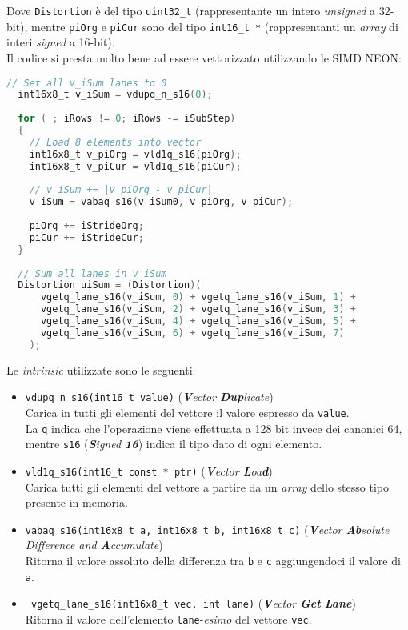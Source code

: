 Dove \verb|Distortion| è del tipo \verb|uint32_t| (rappresentante un intero 
\emph{unsigned} a 32-bit), mentre \verb|piOrg| e \verb|piCur| sono del tipo 
\verb|int16_t *| (rappresentanti un \emph{array} di interi \emph{signed} a 
16-bit).\\

Il codice si presta molto bene ad essere vettorizzato utilizzando le SIMD NEON:

\begin{lstlisting}[language=C]
  // Set all v_iSum lanes to 0
  int16x8_t v_iSum = vdupq_n_s16(0);
  
  for ( ; iRows != 0; iRows -= iSubStep)
  {
    // Load 8 elements into vector
    int16x8_t v_piOrg = vld1q_s16(piOrg);
    int16x8_t v_piCur = vld1q_s16(piCur);
    
    // v_iSum += |v_piOrg - v_piCur|
    v_iSum = vabaq_s16(v_iSum0, v_piOrg, v_piCur);
  
    piOrg += iStrideOrg;
    piCur += iStrideCur;
  }
  
  // Sum all lanes in v_iSum
  Distortion uiSum = (Distortion)(
      vgetq_lane_s16(v_iSum, 0) + vgetq_lane_s16(v_iSum, 1) +
      vgetq_lane_s16(v_iSum, 2) + vgetq_lane_s16(v_iSum, 3) +
      vgetq_lane_s16(v_iSum, 4) + vgetq_lane_s16(v_iSum, 5) +
      vgetq_lane_s16(v_iSum, 6) + vgetq_lane_s16(v_iSum, 7)
    );
\end{lstlisting}

Le \emph{intrinsic} utilizzate sono le seguenti:

\begin{itemize}
  \item \verb|vdupq_n_s16(int16_t value)| (\emph{\textbf{V}ector 
    \textbf{Dup}licate})\\
      Carica in tutti gli elementi del vettore il valore espresso da 
      \verb|value|.\\
      La \verb|q| indica che l'operazione viene effettuata a 128 bit invece dei 
      canonici 64, mentre \verb|s16| (\emph{\textbf{S}igned \textbf{16}}) 
      indica il tipo dato di ogni elemento.
  \item \verb|vld1q_s16(int16_t const * ptr)| (\emph{\textbf{V}ector 
    \textbf{L}oa\textbf{d}})\\
      Carica tutti gli elementi del vettore a partire da un \emph{array} dello 
      stesso tipo presente in memoria.
  \item \verb|vabaq_s16(int16x8_t a, int16x8_t b, int16x8_t c)| 
    (\emph{\textbf{V}ector \textbf{Ab}solute Difference and 
    \textbf{A}ccumulate})\\
      Ritorna il valore assoluto della differenza tra \verb|b| e \verb|c| 
      aggiungendoci il valore di \verb|a|.
  \item \verb| vgetq_lane_s16(int16x8_t vec, int lane)| (\emph{\textbf{V}ector 
    \textbf{Get} \textbf{Lane}})\\
      Ritorna il valore dell'elemento \verb|lane|-\emph{esimo} del vettore 
      \verb|vec|.      
\end{itemize}

